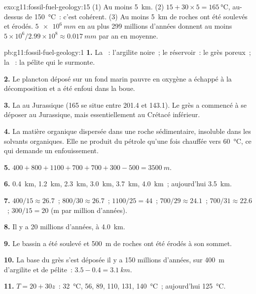 \begin{solution}{exo:g11:fossil-fuel-geology:15}
(1) Au moins \qty{5}{km}. (2) $15 + 30 \times 5 = \qty{165}{\degreeCelsius}$,
au-dessus de \qty{150}{\degreeCelsius}~: c'est cohérent. (3) Au moins
\qty{5}{km} de roches ont été soulevés et érodés. $\qty{5e6}{mm}$ en au
plus \num{299} millions d'années donnent au moins $5 \times 10^6/2.99 \times 10^8
\approx \qty{0.017}{mm}$
par an en moyenne.
\end{solution}

\begin{solution}{pb:g11:fossil-fuel-geology:1}
\textbf{1.} La ~: l'argilite noire~; le réservoir~: le grès
poreux~; la ~: la pélite qui le surmonte.

\textbf{2.} Le plancton déposé sur un fond marin pauvre en oxygène a
échappé à la décomposition et a été enfoui dans la boue.

\textbf{3.} La  au Jurassique (165 se situe entre 201.4 et
143.1). Le grès a commencé à se déposer au Jurassique, mais
essentiellement au Crétacé inférieur.

\textbf{4.} La matière organique dispersée dans une roche sédimentaire,
insoluble dans les solvants organiques. Elle ne produit du pétrole qu'une
fois chauffée vers \qty{60}{\degreeCelsius}, ce qui demande un
enfouissement.

\textbf{5.} $400 + 800 + 1100 + 700 + 700 + 300 - 500 = \qty{3500}{m}$.

\textbf{6.} \qty{0.4}{km}, \qty{1.2}{km}, \qty{2.3}{km}, \qty{3.0}{km},
\qty{3.7}{km}, \qty{4.0}{km}~; aujourd'hui \qty{3.5}{km}.

\textbf{7.} $400/15 \approx 26.7$~; $800/30 \approx 26.7$~; $1100/25 = 44$~;
$700/29 \approx 24.1$~; $700/31 \approx 22.6$~; $300/15 = 20$ (\unit{m} par
million d'années).

\textbf{8.} Il y a 20 millions d'années, à \qty{4.0}{km}.

\textbf{9.} Le bassin a été soulevé et \qty{500}{m} de roches ont été
érodés à son sommet.

\textbf{10.} La base du grès s'est déposée il y a 150 millions d'années,
sur \qty{400}{m} d'argilite et de pélite~: $3.5 - 0.4 = \qty{3.1}{km}$.

\textbf{11.} $T = 20 + 30 z$~: \qty{32}{\degreeCelsius}, \num{56}, \num{89},
\num{110}, \num{131}, \qty{140}{\degreeCelsius}~; aujourd'hui
\qty{125}{\degreeCelsius}.


\end{solution}
